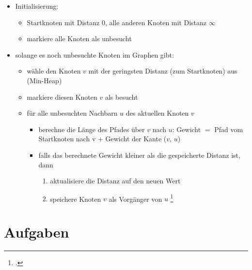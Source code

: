 \documentclass{lehramt-informatik-haupt}
\begin{document}
\begin{itemize}
\item Initialisierung:

\begin{itemize}
\item Startknoten mit Distanz $0$, alle anderen Knoten mit Distanz
$\infty$

\item markiere alle Knoten als unbesucht
\end{itemize}

\item solange es noch unbesuchte Knoten im Graphen gibt:

\begin{itemize}
\item wähle den Knoten $v$ mit der geringsten Distanz (zum Startknoten)
aus (Min-Heap)

\item markiere diesen Knoten $v$ als besucht

\item für alle unbesuchten Nachbarn $u$ des aktuellen Knoten $v$

\begin{itemize}
\item berechne die Länge des Pfades über $v$ nach $u$: Gewicht $=$ Pfad
vom Startknoten nach v $+$ Gewicht der Kante ($v$, $u$)

\item falls das berechnete Gewicht kleiner als die gespeicherte Distanz
ist, dann

\begin{enumerate}
\item aktualisiere die Distanz auf den neuen Wert
\item speichere Knoten $v$ als Vorgänger von $u$
\footcite[Seite 12]{aud:fs:6}
\end{enumerate}
\end{itemize}
\end{itemize}
\end{itemize}


%

\chapter{Aufgaben}
\end{document}
